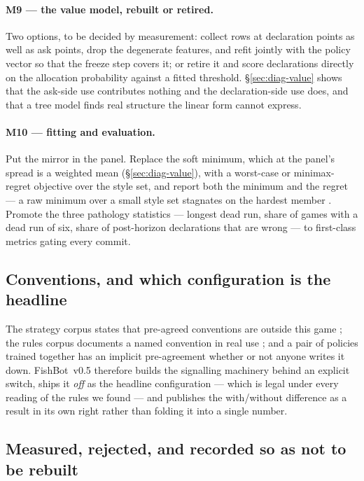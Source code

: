 \documentclass[11pt]{article}
\theoremstyle{definition}
\DeclareRobustCommand{\vfive}{\texorpdfstring{\mbox{FishBot v0.5}}{FishBot v0.5}}
\begin{document}
\paragraph{M9 --- the value model, rebuilt or retired.} Two options, to be decided
by measurement: collect rows at declaration points as well as ask points, drop
the degenerate features, and refit jointly with the policy vector so that the
freeze step covers it; or retire it and score declarations directly on the
allocation probability against a fitted threshold. \S\ref{sec:diag-value} shows
that the ask-side use contributes nothing and the declaration-side use does, and
that a tree model finds real structure the linear form cannot express.

\paragraph{M10 --- fitting and evaluation.} Put the mirror in the panel. Replace
the soft minimum, which at the panel's spread is a weighted mean
(\S\ref{sec:diag-value}), with a worst-case or minimax-regret objective over the
style set, and report both the minimum and the regret --- a raw minimum over a
small style set stagnates on the hardest member \cite{beukman-remidi}. Promote
the three pathology statistics --- longest dead run, share of games with a dead
run of six, share of post-horizon declarations that are wrong --- to first-class
metrics gating every commit.

\subsection{Conventions, and which configuration is the headline}
\label{sec:mech-conventions}

The strategy corpus states that pre-agreed conventions are outside this game
\cite{develin}; the rules corpus documents a named convention in real use
\cite{pagat}; and a pair of policies trained together has an implicit
pre-agreement whether or not anyone writes it down. \vfive{} therefore builds the
signalling machinery behind an explicit switch, ships it \emph{off} as the
headline configuration --- which is legal under every reading of the rules we
found --- and publishes the with/without difference as a result in its own right
rather than folding it into a single number.

\subsection{Measured, rejected, and recorded so as not to be rebuilt}
\label{sec:mech-rejected}
\end{document}

